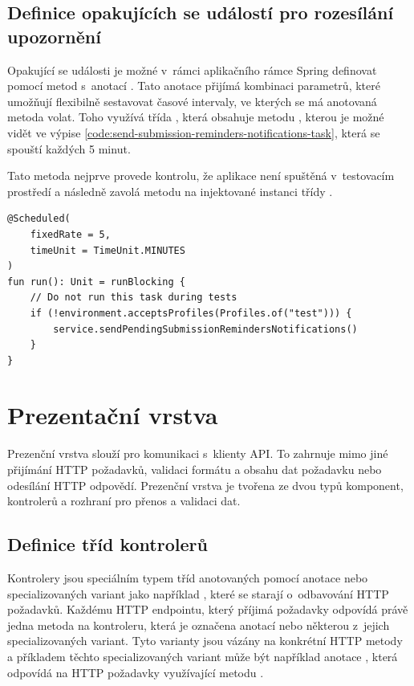 \subsection{Definice opakujících se událostí pro rozesílání upozornění}

Opakující se události je možné v~rámci aplikačního rámce Spring definovat pomocí metod s~anotací . Tato anotace přijímá kombinaci parametrů, které umožňují flexibilně sestavovat časové intervaly, ve kterých se má anotovaná metoda volat. Toho využívá třída , která obsahuje metodu , kterou je možné vidět ve výpise \ref{code:send-submission-reminders-notifications-task}, která se spouští každých 5 minut. 

Tato metoda nejprve provede kontrolu, že aplikace není spuštěná v~testovacím prostředí a následně zavolá metodu  na injektované instanci třídy .

\begin{lstlisting}[label={code:send-submission-reminders-notifications-task}, caption={Definice periodicky spouštěné metody run}]
@Scheduled(
    fixedRate = 5,
    timeUnit = TimeUnit.MINUTES
)
fun run(): Unit = runBlocking {
    // Do not run this task during tests
    if (!environment.acceptsProfiles(Profiles.of("test"))) {
        service.sendPendingSubmissionRemindersNotifications()
    }
}
\end{lstlisting}

\section{Prezentační vrstva}

Prezenční vrstva slouží pro komunikaci s~klienty API. To zahrnuje mimo jiné přijímání HTTP požadavků, validaci formátu a obsahu dat požadavku nebo odesílání HTTP odpovědí. Prezenční vrstva je tvořena ze dvou typů komponent, kontrolerů a rozhraní pro přenos a validaci dat.

\subsection{Definice tříd kontrolerů}

Kontrolery jsou speciálním typem tříd anotovaných pomocí anotace  nebo specializovaných variant jako například , které se starají o~odbavování HTTP požadavků. Každému HTTP endpointu, který příjimá požadavky odpovídá právě jedna metoda na kontroleru, která je označena anotací  nebo některou z~jejich specializovaných variant. Tyto varianty jsou vázány na konkrétní HTTP metody a příkladem těchto specializovaných variant může být například anotace , která odpovídá na HTTP požadavky využívající metodu  \cite[kap. 1.3.1]{walls_spring_2019}.

